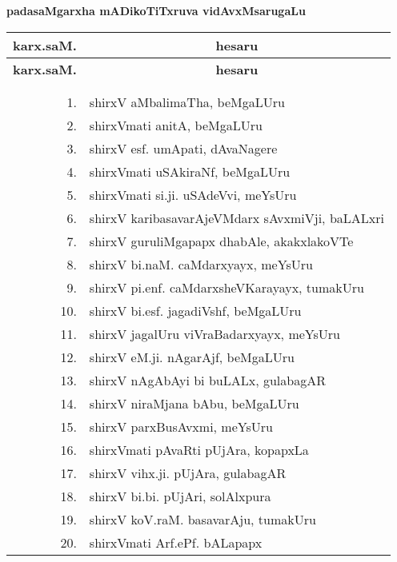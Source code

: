 \begin{center}
{\large\bf padasaMgarxha mADikoTiTxruva vidAvxMsarugaLu}

\thispagestyle{empty}

\lhead[]{}
\rhead[]{}

\begin{minipage}[t]{7cm}
{\renewcommand{\arraystretch}{1.5}
\begin{longtable}{rl}
\hline
{\bf karx.saM.} & \multicolumn{1}{c}{\bf hesaru}\\[3pt]
\hline
\endfirsthead
\hline
{\bf karx.saM.} & \multicolumn{1}{c}{\bf hesaru}\\[3pt]
\hline
  & \\[-10pt]
\endhead
\endfoot
\endlastfoot
  & \\[-15pt]
1. & shirxV aMbalimaTha, beMgaLUru\\
2. & shirxVmati anitA, beMgaLUru\\
3. & shirxV esf. umApati, dAvaNagere\\
4. & shirxVmati uSAkiraNf, beMgaLUru\\
5. & shirxVmati si.ji. uSAdeVvi, meYsUru\\
6. & shirxV karibasavarAjeVMdarx sAvxmiVji, baLALxri\\
7. & shirxV guruliMgapapx dhabAle, akakxlakoVTe\\
8. & shirxV bi.naM. caMdarxyayx, meYsUru\\
9. & shirxV pi.enf. caMdarxsheVKarayayx, tumakUru\\
10. & shirxV bi.esf. jagadiVshf, beMgaLUru\\
11. & shirxV jagalUru viVraBadarxyayx, meYsUru\\
12. & shirxV eM.ji. nAgarAjf, beMgaLUru\\
13. &  shirxV nAgAbAyi bi buLALx, gulabagAR\\
14. & shirxV niraMjana bAbu, beMgaLUru\\
15. & shirxV parxBusAvxmi, meYsUru\\
16. & shirxVmati pAvaRti pUjAra, kopapxLa\\
17. & shirxV vihx.ji. pUjAra, gulabagAR\\
18. & shirxV bi.bi. pUjAri, solAlxpura\\
19. & shirxV koV.raM. basavarAju, tumakUru\\
20. & shirxVmati Arf.ePf. bALapapx 

\end{longtable}}
\end{minipage}
\end{center}
